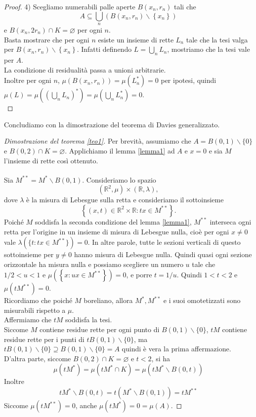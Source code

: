 \documentclass[a4paper, twoside,openright]{article}
\newcommand{\<}{\langle}
\renewcommand{\>}{\rangle}
\begin{document}
\begin{proof}
	4) Scegliamo numerabili palle aperte $B\left(x_{n}, r_{n}\right)$ tali che
	$$ A \subseteq \bigcup_{n}\left(B\left(x_{n}, r_{n}\right) \backslash\left\{x_{n}\right\}\right)$$
	e $B\left(x_{n}, 2 r_{n}\right) \cap K=\varnothing$ per ogni $n$.\\
	Basta mostrare che per ogni $n$ esiste un insieme di rette $L_{n}$ tale che la tesi valga per $B\left(x_{n}, r_{n}\right) \backslash\left\{x_{n}\right\}$. Infatti definendo $L=\bigcup_n L_n$, mostriamo che la tesi vale per $A$.\\
	La condizione di residualità passa a unioni arbitrarie.\\
	Inoltre per ogni $n$, $\mu(B(x_n,r_n))=\mu(L_n^*)=0$ per ipotesi, quindi $\mu(L)=\mu((\bigcup_nL_n)^*) = \mu(\bigcup_n L_n^*)=0$.\\
	
	\end{proof}

Concludiamo con la dimostrazione del teorema di Davies generalizzato.

\begin{proof}[Dimostrazione del teorema \ref{teo1}]
	
Per brevità, assumiamo che $A=B(0,1) \backslash\{0\}$ e $B(0,2) \cap K=\varnothing$. Applichiamo il lemma \ref{lemma1} ad $A$ e $x=0$ e sia $M$ l'insieme di rette così ottenuto.\\
\hfill \\
Sia $M^{* *}=M^{*} \backslash B(0,1)$. Consideriamo lo spazio
$$
\left(\mathbb{R}^{2}, \mu\right) \times(\mathbb{R}, \lambda),
$$
dove $\lambda$ è la misura di Lebesgue sulla retta e consideriamo il sottoinsieme
$$
\left\{(x, t) \in \mathbb{R}^{2} \times \mathbb{R}: t x \in M^{* *}\right\} .
$$
Poiché $M$ soddisfa la seconda condizione del lemma \ref{lemma1}, $M^{**}$ interseca ogni retta per l'origine in un insieme di misura di Lebesgue nulla, cioè per ogni $x \neq 0$ vale $\lambda(\{t: tx \in M^{**}\})=0$. In altre parole, tutte le sezioni verticali di questo sottoinsieme per $y\neq 0$  hanno misura di Lebesgue nulla. Quindi quasi ogni sezione orizzontale ha misura nulla e possiamo scegliere un numero $u$ tale che $1 / 2<u<1$ e $\mu\left(\left\{x: u x \in M^{* *}\right\}\right)=0$, e porre $t=1 / u$. Quindi $1<t<2$ e $\mu\left(t M^{* *}\right)=0$.\\
Ricordiamo che poiché $M$ boreliano, allora $M^*, M^{**}$ e i suoi omotetizzati sono misurabili rispetto a $\mu$.\\
Affermiamo che $t M$ soddisfa la tesi.\\
Siccome $M$ contiene residue rette per ogni punto di $B(0,1) \backslash\{0\}$, $t M$ contiene residue rette per i punti di $t B(0,1) \backslash\{0\}$, ma $t B(0,1) \backslash\{0\} \supseteq B(0,1) \backslash\{0\}=A$ quindi è vera la prima affermazione.\\
D'altra parte, siccome $B(0,2) \cap K=\varnothing$ e $t<2$, si ha
$$
\mu\left(t M^{*}\right)=\mu\left(t M^{*} \cap K\right)=\mu\left(t M^{*} \backslash B(0, t)\right)
$$
Inoltre
$$
t M^{*} \backslash B(0, t)=t\left(M^{*} \backslash B(0,1)\right)=t M^{* *}
$$
Siccome $\mu\left(t M^{* *}\right)=0$, anche $\mu (tM^*)= 0= \mu(A)$.

\end{proof}
\end{document}
